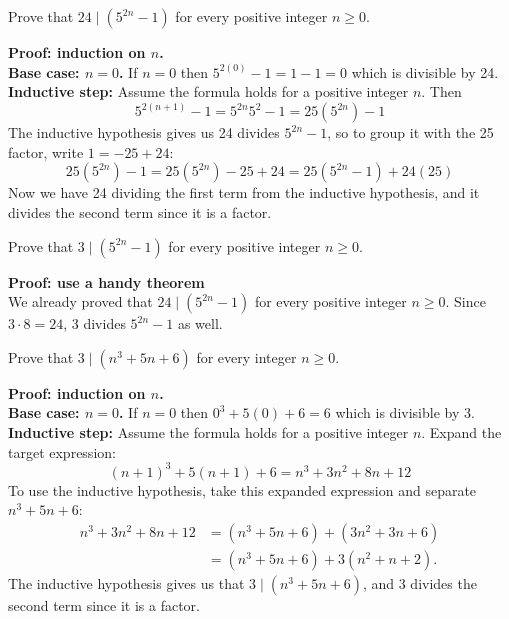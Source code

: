 \documentclass{article}
\begin{document}
\begin{problem}
Prove that $24 \mid (5^{2n} - 1)$ for every positive integer $n \geq 0$.
\end{problem}
\textbf{Proof: induction on $n$.}
\\

\textbf{Base case: $n = 0$.} If $n = 0$ then $5^{2(0)} - 1 = 1 - 1 = 0$ which is divisible by 24.
\\

\textbf{Inductive step:} Assume the formula holds for a positive integer $n$. Then
$$5^{2(n+1)} - 1 = 5^{2n}5^2 - 1 = 25(5^{2n}) - 1$$
The inductive hypothesis gives us 24 divides $5^{2n} - 1$, so to group it with the 25 factor, write $1 = -25 + 24$:
$$25(5^{2n}) - 1 = 25(5^{2n}) - 25 + 24 = 25(5^{2n} - 1) + 24(25)$$
Now we have 24 dividing the first term from the inductive hypothesis, and it divides the second term since it is a factor.

\begin{problem}
Prove that $3 \mid (5^{2n} - 1)$ for every positive integer $n \geq 0$.
\end{problem}

\textbf{Proof: use a handy theorem}
\\

We already proved that $24 \mid (5^{2n} - 1)$ for every positive integer $n \geq 0$. Since $3 \cdot 8 = 24$, 3 divides $5^{2n} - 1$ as well.

\begin{problem}
Prove that $3 \mid (n^3 + 5n + 6)$ for every integer $n \geq 0$.
\end{problem}

\textbf{Proof: induction on $n$.}
\\

\textbf{Base case: $n = 0$.} If $n = 0$ then $0^3 + 5(0) + 6 = 6$ which is divisible by 3.
\\

\textbf{Inductive step:} Assume the formula holds for a positive integer $n$. Expand the target expression:
$$(n+1)^3 + 5(n+1) + 6 = n^3 + 3n^2 + 8n + 12$$
To use the inductive hypothesis, take this expanded expression and separate $n^3 + 5n + 6$:
\begin{align*}
    n^3 + 3n^2 + 8n + 12 & = (n^3 + 5n + 6) + (3n^2 + 3n + 6) \\
                         & = (n^3 + 5n + 6) + 3(n^2 + n+2).
\end{align*}
The inductive hypothesis gives us that $3 \mid (n^3 + 5n + 6)$, and 3 divides the second term since it is a factor.
\end{document}
